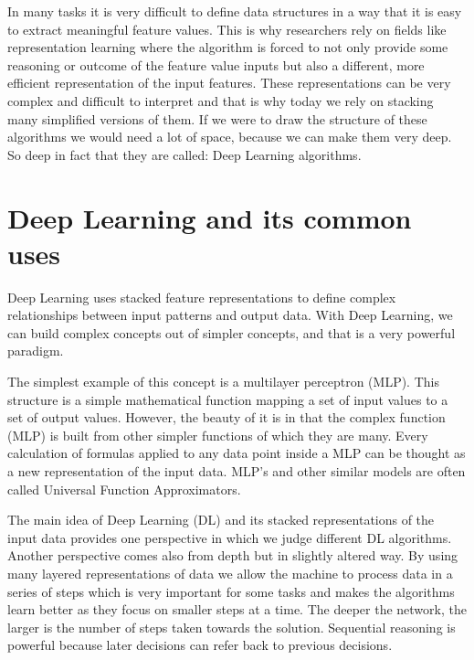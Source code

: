 \documentclass[b5paper]{book}
\let\cite\parencite
\begin{document}
In many tasks it is very difficult to define data structures in a way that it is easy to extract meaningful feature values. This is why researchers rely on fields like representation learning where the algorithm is forced to not only provide some reasoning or outcome of the feature value inputs but also a different, more efficient representation of the input features. These representations can be very complex and difficult to interpret and that is why today we rely on stacking many simplified versions of them. If we were to draw the structure of these algorithms we would need a lot of space, because we can make them very deep. So deep in fact that they are called: Deep Learning algorithms.

\section{Deep Learning and its common uses}

Deep Learning uses stacked feature representations to define complex relationships between input patterns and output data. With Deep Learning, we can build complex concepts out of simpler concepts, and that is a very powerful paradigm. 

The simplest example of this concept is a multilayer perceptron (MLP). \cite{russell2002artificial} This structure is a simple mathematical function mapping a set of input values to a set of output values. However, the beauty of it is in that the complex function (MLP) is built from other simpler functions of which they are many. Every calculation of formulas applied to any data point inside a MLP can be thought as a new representation of the input data. MLP's and other similar models are often called Universal Function Approximators. 

The main idea of Deep Learning (DL) \cite{lecun2015deep} and its stacked representations of the input data provides one perspective in which we judge different DL algorithms. Another perspective comes also from depth but in slightly altered way. By using many layered representations of data we allow the machine to process data in a series of steps which is very important for some tasks and makes the algorithms learn better as they focus on smaller steps at a time. The deeper the network, the larger is the number of steps taken towards the solution. Sequential reasoning is powerful because later decisions can refer back to previous decisions. 
\end{document}
